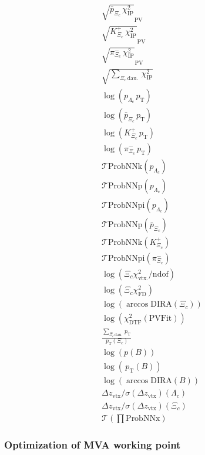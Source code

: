 \begin{eqnarray*}
\sqrt{\bar{p}_{\Xi_c}\,\chi^2_\textrm{IP}}_{\textrm{PV}} \\
\sqrt{K^{+}_{\Xi_c}\,\chi^2_\textrm{IP}}_{\textrm{PV}} \\
\sqrt{\pi^{-}_{\Xi_c}\,\chi^2_\textrm{IP}}_{\textrm{PV}} \\
\sqrt{\sum_{\Xi_c\,\textrm{dau.}}\,\chi^2_\textrm{IP}} \\
\log(p_{{\Lambda_c}}\,p_\mathrm{T})\\
\log(\bar{p}_{\Xi_c}\,p_\mathrm{T})\\
\log(K^{+}_{\Xi_c}\,p_\mathrm{T})\\
\log(\pi^{-}_{\Xi_c}\,p_\mathrm{T})\\
\mathcal{T}\textrm{ProbNNk}(p_{{\Lambda_c}})\\
\mathcal{T}\textrm{ProbNNp}(p_{{\Lambda_c}})\\
\mathcal{T}\textrm{ProbNNpi}(p_{{\Lambda_c}})\\
\mathcal{T}\textrm{ProbNNp}(\bar{p}_{\Xi_c})\\
\mathcal{T}\textrm{ProbNNk}(K^+_{\Xi_c})\\
\mathcal{T}\textrm{ProbNNpi}(\pi^-_{\Xi_c})\\
\log(\Xi_c\chi^2_\textrm{vtx.}/\textrm{ndof})\\
\log(\Xi_c\chi^2_\textrm{FD})\\
\log(\arccos{\textrm{DIRA}(\Xi_c)})\\
\log(\chi^2_\textrm{DTF}(\textrm{PVFit}))\\
\frac{\sum_{\Xi_c\,\textrm{dau.}} \,p_\mathrm{T}}{\,p_\mathrm{T}(\Xi_c)}\\
\log(p(B))\\
\log(\,p_\mathrm{T}(B))\\
\log(\arccos{\textrm{DIRA}(B)})\\
\Delta{z_\textrm{vtx}}/\sigma(\Delta{z_\textrm{vtx}})(\Lambda_c)\\
\Delta{z_\textrm{vtx}}/\sigma(\Delta{z_\textrm{vtx}})(\Xi_c)\\
\mathcal{T}(\prod{\textrm{ProbNNx}})
\end{eqnarray*}

\subsubsection{Optimization of MVA working point}

